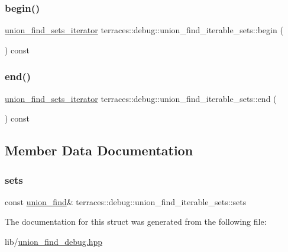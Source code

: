 \subsubsection{\texorpdfstring{begin()}{begin()}}
{\footnotesize\ttfamily \hyperlink{classterraces_1_1debug_1_1union__find__sets__iterator}{union\+\_\+find\+\_\+sets\+\_\+iterator} terraces\+::debug\+::union\+\_\+find\+\_\+iterable\+\_\+sets\+::begin (\begin{DoxyParamCaption}{ }\end{DoxyParamCaption}) const\hspace{0.3cm}{\ttfamily [inline]}}

\mbox{\label{structterraces_1_1debug_1_1union__find__iterable__sets_a01ca57c0f1b1250077b716c83eabe6a9}} 
\subsubsection{\texorpdfstring{end()}{end()}}
{\footnotesize\ttfamily \hyperlink{classterraces_1_1debug_1_1union__find__sets__iterator}{union\+\_\+find\+\_\+sets\+\_\+iterator} terraces\+::debug\+::union\+\_\+find\+\_\+iterable\+\_\+sets\+::end (\begin{DoxyParamCaption}{ }\end{DoxyParamCaption}) const\hspace{0.3cm}{\ttfamily [inline]}}



\subsection{Member Data Documentation}
\mbox{\label{structterraces_1_1debug_1_1union__find__iterable__sets_a4f0fc9e5201089220b2fc8b6fd5445f7}} 
\subsubsection{\texorpdfstring{sets}{sets}}
{\footnotesize\ttfamily const \hyperlink{classterraces_1_1union__find}{union\+\_\+find}\& terraces\+::debug\+::union\+\_\+find\+\_\+iterable\+\_\+sets\+::sets}



The documentation for this struct was generated from the following file\+:\begin{DoxyCompactItemize}
\item 
lib/\hyperlink{union__find__debug_8hpp}{union\+\_\+find\+\_\+debug.\+hpp}\end{DoxyCompactItemize}
